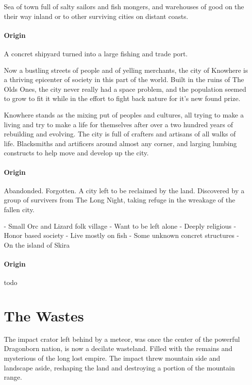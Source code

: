 \documentclass[letterpaper,twocolumn,openany,nodeprecatedcode]{dndbook}
\begin{document}

Sea of town full of salty sailors and fish mongers, and warehouses of good on the their way
inland or to other surviving cities on distant coasts.

\paragraph{Origin}
A concret shipyard turned into a large fishing and trade port.


Now a bustling streets of people and of yelling merchants, the city of Knowhere is a thriving
epicenter of society in this part of the world. Built in the ruins of The Olds Ones, the city
never really had a space problem, and the population seemed to grow to fit it while in the
effort to fight back nature for it's new found prize.

Knowhere stands as the mixing put of peoples and cultures, all trying to make a living and
try to make a life for themselves after over a two hundred years of rebuilding and evolving.
The city is full of crafters and artisans of all walks of life. Blacksmiths and artificers
around almost any corner, and larging lumbing constructs to help move and develop up the
city.

\paragraph{Origin}
Abandonded. Forgotten. A city left to be reclaimed by the land. Discovered by a group of
survivers from The Long Night, taking refuge in the wreakage of the fallen city.

- Small Orc and Lizard folk village
- Want to be left alone
- Deeply religious
- Honor based society
- Live mostly on fish
- Some unknown concret structures
- On the island of Skira

\paragraph{Origin}
todo

\section{The Wastes}

The impact crator left behind by a meteor, was once the center of the powerful Dragonborn
nation, is now a decilate wasteland. Filled with the remains and mysterious of the long
lost empire. The impact threw mountain side and landscape aside, reshaping the land
and destroying a portion of the mountain range.
\end{document}
